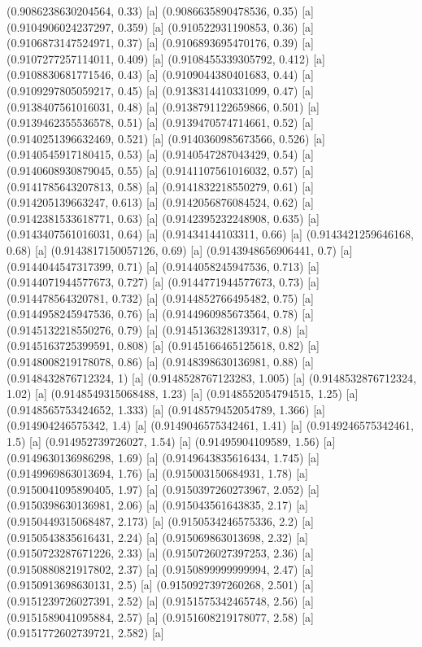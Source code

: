 {{{(0.9086238630204564, 0.33) [a] 
(0.9086635890478536, 0.35) [a] 
(0.9104906024237297, 0.359) [a] 
(0.910522931190853, 0.36) [a] 
(0.9106873147524971, 0.37) [a] 
(0.9106893695470176, 0.39) [a] 
(0.9107277257114011, 0.409) [a] 
(0.9108455339305792, 0.412) [a] 
(0.9108830681771546, 0.43) [a] 
(0.9109044380401683, 0.44) [a] 
(0.9109297805059217, 0.45) [a] 
(0.9138314410331099, 0.47) [a] 
(0.9138407561016031, 0.48) [a] 
(0.9138791122659866, 0.501) [a] 
(0.9139462355536578, 0.51) [a] 
(0.9139470574714661, 0.52) [a] 
(0.9140251396632469, 0.521) [a] 
(0.9140360985673566, 0.526) [a] 
(0.9140545917180415, 0.53) [a] 
(0.9140547287043429, 0.54) [a] 
(0.9140608930879045, 0.55) [a] 
(0.9141107561016032, 0.57) [a] 
(0.9141785643207813, 0.58) [a] 
(0.9141832218550279, 0.61) [a] 
(0.914205139663247, 0.613) [a] 
(0.9142056876084524, 0.62) [a] 
(0.9142381533618771, 0.63) [a] 
(0.9142395232248908, 0.635) [a] 
(0.9143407561016031, 0.64) [a] 
(0.91434144103311, 0.66) [a] 
(0.9143421259646168, 0.68) [a] 
(0.9143817150057126, 0.69) [a] 
(0.9143948656906441, 0.7) [a] 
(0.9144044547317399, 0.71) [a] 
(0.9144058245947536, 0.713) [a] 
(0.9144071944577673, 0.727) [a] 
(0.9144771944577673, 0.73) [a] 
(0.914478564320781, 0.732) [a] 
(0.9144852766495482, 0.75) [a] 
(0.9144958245947536, 0.76) [a] 
(0.9144960985673564, 0.78) [a] 
(0.9145132218550276, 0.79) [a] 
(0.9145136328139317, 0.8) [a] 
(0.9145163725399591, 0.808) [a] 
(0.9145166465125618, 0.82) [a] 
(0.9148008219178078, 0.86) [a] 
(0.9148398630136981, 0.88) [a] 
(0.9148432876712324, 1) [a] 
(0.9148528767123283, 1.005) [a] 
(0.9148532876712324, 1.02) [a] 
(0.9148549315068488, 1.23) [a] 
(0.9148552054794515, 1.25) [a] 
(0.9148565753424652, 1.333) [a] 
(0.9148579452054789, 1.366) [a] 
(0.914904246575342, 1.4) [a] 
(0.9149046575342461, 1.41) [a] 
(0.9149246575342461, 1.5) [a] 
(0.914952739726027, 1.54) [a] 
(0.91495904109589, 1.56) [a] 
(0.9149630136986298, 1.69) [a] 
(0.9149643835616434, 1.745) [a] 
(0.9149969863013694, 1.76) [a] 
(0.915003150684931, 1.78) [a] 
(0.9150041095890405, 1.97) [a] 
(0.9150397260273967, 2.052) [a] 
(0.9150398630136981, 2.06) [a] 
(0.915043561643835, 2.17) [a] 
(0.9150449315068487, 2.173) [a] 
(0.9150534246575336, 2.2) [a] 
(0.9150543835616431, 2.24) [a] 
(0.915069863013698, 2.32) [a] 
(0.9150723287671226, 2.33) [a] 
(0.9150726027397253, 2.36) [a] 
(0.9150880821917802, 2.37) [a] 
(0.9150899999999994, 2.47) [a] 
(0.9150913698630131, 2.5) [a] 
(0.9150927397260268, 2.501) [a] 
(0.9151239726027391, 2.52) [a] 
(0.9151575342465748, 2.56) [a] 
(0.9151589041095884, 2.57) [a] 
(0.9151608219178077, 2.58) [a] 
(0.9151772602739721, 2.582) [a] 
}}}
